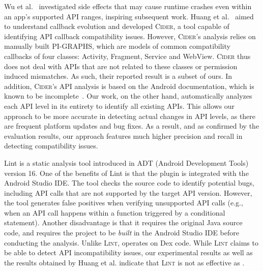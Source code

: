 Wu et al.~\cite{wu2017measuring} investigated side
effects that may cause runtime crashes even within an
app's supported API ranges, inspiring subsequent work.
%
Huang et al.~\cite{huang2018understanding} aimed to
understand callback evolution and developed
\textsc{Cider}, a tool capable of identifying API
callback compatibility issues. However,
\textsc{Cider}'s analysis relies on manually built
PI-GRAPHS, which are models of common compatibility
callbacks of four classes: Activity, Fragment, Service
and WebView. \textsc{Cider} thus does not deal with
APIs that are not related to these classes or
permission induced mismatches. 
As such, their reported result is a subset of ours. In
addition, \textsc{Cider}'s API analysis is based on the
Android documentation, which is known to be
incomplete~\cite{wu2017measuring}. Our work, on the
other hand, automatically analyzes each API level in
its entirety to identify all existing APIs. This allows
our approach to be more accurate in detecting actual
changes in API levels, as there are frequent platform
updates and bug fixes. As a result, and as confirmed by
the evaluation results, our approach features much
higher precision and recall in detecting compatibility
issues.

Lint \cite{linttips} is a static analysis tool
introduced in ADT (Android Development Tools) version
16. One of the benefits of Lint is that the plugin is
integrated with the Android Studio IDE. The tool checks
the source code to identify potential bugs, including API calls that
are not supported by the target API version. However,
the tool generates false positives when verifying
unsupported API calls (e.g., when an API call happens
within a function triggered by a conditional
statement). Another disadvantage is that it requires the original Java source code, and 
requires the project to be \emph{built} in the Android
Studio IDE before conducting the analysis.  Unlike
\textsc{Lint}, \@approach operates on Dex
code. While \textsc{Lint} claims to be able to detect
API incompatibility issues, our experimental results as
well as the results obtained by Huang et al.  indicate
that \textsc{Lint} is not as effective as \@approach. %


